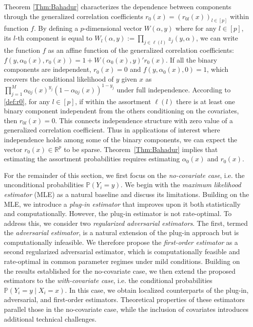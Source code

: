 \documentclass[11pt]{article}
\begin{document}
Theorem \ref{Thm:Bahadur} characterizes the dependence between components through the generalized correlation coefficients $r_0(x)=(r_{0l}(x))_{l\in[p]}$ within function $f$. By defining a $p$-dimensional vector $W(\alpha,y)$ where for any $l\in[p]$, its $l$-th component is equal to $W_{l}(\alpha,y):=\prod_{j\in \ell(l)}z_j(y,\alpha)$, we can write the function $f$ as an affine function of the generalized correlation coefficients: $f(y,\alpha_0(x),r_0(x))= 1+W(\alpha_0(x),y)'r_0(x)$.
If all the binary components are independent, $r_{0}(x)=0$ and $f(y,\alpha_0(x),0)=1$, which recovers the conditional likelihood of $y$ given $x$ as $\prod_{j=1}^M \alpha_{0j}(x)^{y_j}(1-\alpha_{0j}(x))^{1-y_j}$ under full independence. According to \eqref{def:r0}, for any $l\in[p]$, if within the assortment $\ell(l)$ there is at least one binary component independent from the others conditioning on the covariates, then $r_{0l}(x)=0$. This connects independence structure with zero value of a  generalized correlation coefficient. Thus in applications of interest where independence holds among some of the binary components, we can expect the vector $r_0(x) \in \mathbb{R}^p$ to be sparse. Theorem~\ref{Thm:Bahadur} implies that estimating the assortment probabilities requires estimating $\alpha_0(x)$ and $r_0(x)$. 

For the remainder of this section, we first focus on the \textit{no-covariate case}, i.e. the unconditional probabilities $\mathbb{P}(Y_i=y)$. We begin with the \textit{maximum likelihood estimator} (MLE) as a natural baseline and discuss its limitations. Building on the MLE, we introduce a \textit{plug-in estimator} that improves upon it both statistically and computationally. However, the plug-in estimator is not rate-optimal. To address this, we consider two \textit{regularized adversarial estimators}. The first, termed the \textit{adversarial estimator}, is a natural extension of the plug-in approach but is computationally infeasible. We therefore propose the \textit{first-order estimator} as a second regularized adversarial estimator, which is computationally feasible and rate-optimal in common parameter regimes under mild conditions. Building on the results established for the no-covariate case, we then extend the proposed estimators to the \textit{with-covariate case}, i.e. the conditional probabilities $\mathbb{P}(Y_i=y\mid X_i=x)$. In this case, we obtain localized counterparts of the plug-in, adversarial, and first-order estimators. Theoretical properties of these estimators parallel those in the no-covariate case, while the inclusion of covariates introduces additional technical challenges.
\end{document}
